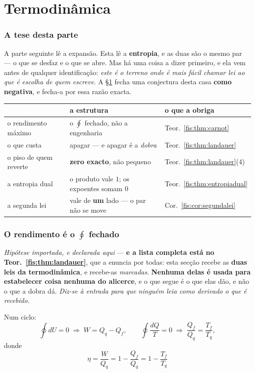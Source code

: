\documentclass[livro.tex]{subfiles}
\begin{document}
\part{Termodinâmica}

\section*{A tese desta parte}\label{fis:termo-tese}

\noindent A parte seguinte lê a expansão. Esta lê a \textbf{entropia}, e as duas
são o mesmo par --- o que se desfaz e o que se abre. Mas há uma coisa a dizer
primeiro, e ela vem antes de qualquer identificação: \emph{este é o terreno onde
é mais fácil chamar lei ao que é escolha de quem escreve}. A §\ref{fis:carnot}
fecha uma conjectura desta casa \textbf{como negativa}, e fecha-a por essa razão
exacta.

\begin{center}\small
\begin{tabular}{@{}lll@{}}
\toprule
& \textbf{a estrutura} & \textbf{o que a obriga} \\
\midrule
o rendimento máximo & o $\oint$ fechado, não a engenharia & Teor.~\ref{fis:thm:carnot} \\
o que custa & apagar --- e apagar é a \emph{dobra} & Teor.~\ref{fis:thm:landauer} \\
o piso de quem reverte & \textbf{zero exacto}, não pequeno & Teor.~\ref{fis:thm:landauer}(4) \\a entropia dual & o produto vale $1$; os expoentes somam $0$ & Teor.~\ref{fis:thm:entropiadual} \\
a segunda lei & vale de \textbf{um} lado --- o par não se move & Cor.~\ref{fis:cor:segundalei} \\
\bottomrule
\end{tabular}
\end{center}

\section{O rendimento é o $\oint$ fechado}\label{fis:carnot}

\begin{teorema}\label{fis:thm:carnot}
\emph{Hipótese importada, e declarada aqui} --- \textbf{e a lista completa está no
Teor.~\ref{fis:thm:landauer}}, que a enuncia por todas: esta secção recebe as
\textbf{duas leis da termodinâmica}, e recebe-as \emph{marcadas}. \textbf{Nenhuma
delas é usada para estabelecer coisa nenhuma do alicerce}, e o que segue é o que
elas dão, e não o que a dobra dá. \emph{Diz-se à entrada para que ninguém leia como
derivado o que é recebido.}

\medskip\noindent Num ciclo:
\[
\oint dU=0 \;\Longrightarrow\; W=Q_q-Q_f ,
\qquad
\oint \frac{dQ}{T}=0 \;\Longrightarrow\; \frac{Q_f}{Q_q}=\frac{T_f}{T_q} ,
\]
donde
\[
\boxed{\;\eta=\frac{W}{Q_q}=1-\frac{Q_f}{Q_q}=1-\frac{T_f}{T_q}\;}
\]
\end{teorema}
\end{document}
